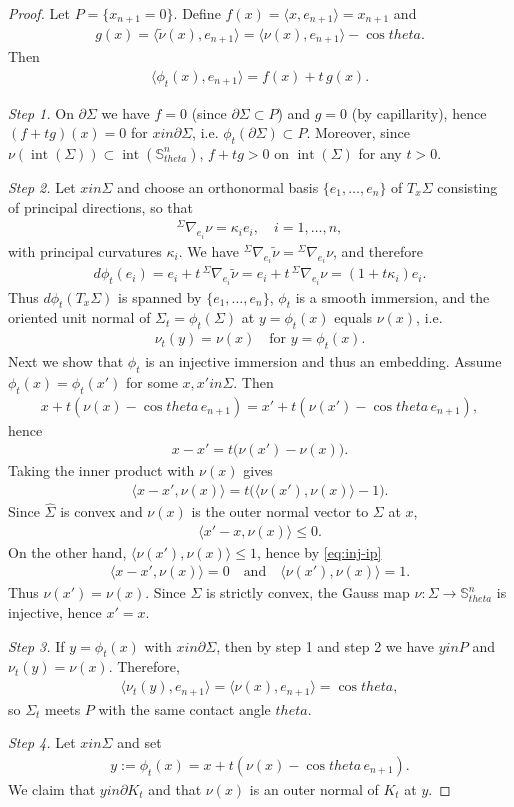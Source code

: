 \documentclass[10pt,a4paper]{amsart}
\newcommand{\Si}{\Sigma}
\newcommand{\bbS}{\mathbb{S}}
\newcommand{\eq}[1]{\begin{equation}\begin{alignedat}{2}#1\end{alignedat}\end{equation}}
\def\in{in }%
\newcommand{\ip}[2]{\langle #1,#2 \rangle}
\newcommand{\op}[1]{\operatorname{#1}}
\def\theta{theta}%
\newcommand{\wh}{\widehat}
\begin{document}
\begin{proof}
Let $P=\{x_{n+1}=0\}$. Define $f(x)=\langle x,e_{n+1}\rangle=x_{n+1}$ and
\eq{
  g(x)=\langle \tilde\nu(x),e_{n+1}\rangle
       =\langle \nu(x),e_{n+1}\rangle-\cos\theta.
}
Then
\eq{\label{eq:height-after-shift}
  \langle \phi_t(x),e_{n+1}\rangle = f(x)+t\,g(x).
}   

\emph{Step 1.}
On $\partial\Sigma$ we have $f=0$ (since $\partial\Sigma\subset P$) and $g=0$ (by capillarity),
hence $(f+tg)(x)=0$ for $x\in\partial\Sigma$, i.e. $\phi_t(\partial\Sigma)\subset P$. Moreover, since $\nu(\op{int}(\Si))\subset \op{int}(\bbS^n_{\theta})$, $f+t g>0$ on $\op{int}(\Sigma)$ for any $t>0$. 

\emph{Step 2.}
Let $x\in\Sigma$ and choose an orthonormal basis $\{e_1,\dots,e_n\}$ of $T_x\Sigma$
consisting of principal directions, so that
\eq{
  {}^{\Si}\nabla_{e_i}\nu=\kappa_i e_i,\quad i=1,\dots,n,
}
with principal curvatures $\kappa_i$.
We have ${}^{\Si}\nabla_{e_i}\tilde\nu={}^{\Si}\nabla_{e_i}\nu$, and therefore
\eq{
  d\phi_t(e_i)=e_i+t\,{}^{\Si}\nabla_{e_i}\tilde\nu
  =e_i+t\,{}^{\Si}\nabla_{e_i}\nu
  =(1+t\kappa_i)e_i.
}
Thus $d\phi_t(T_x\Sigma)$ is spanned by $\{e_1,\dots,e_n\}$, $\phi_t$ is a smooth immersion, and the oriented unit normal of $\Sigma_t=\phi_t(\Sigma)$
at $y=\phi_t(x)$ equals $\nu(x)$, i.e.
\eq{
  \nu_t(y)=\nu(x)\quad\text{for }y=\phi_t(x).
}
Next we show that $\phi_t$ is an injective immersion and thus an embedding. Assume $\phi_t(x)=\phi_t(x')$ for some
$x,x'\in\Sigma$. Then
\eq{
  x+t(\nu(x)-\cos\theta\,e_{n+1})=x'+t(\nu(x')-\cos\theta\,e_{n+1}),
}
hence
\eq{\label{eq:inj-start}
  x-x'=t\bigl(\nu(x')-\nu(x)\bigr).
}
Taking the inner product with $\nu(x)$ gives
\eq{\label{eq:inj-ip}
  \ip{x-x'}{\nu(x)}=t\bigl(\ip{\nu(x')}{\nu(x)}-1\bigr).
}
Since $\wh{\Si}$ is convex and $\nu(x)$ is the outer normal vector to $\Si$ at $x$,
\eq{
  \ip{x'-x}{\nu(x)}\le 0.
}
On the other hand, $\ip{\nu(x')}{\nu(x)}\le 1$, hence by \eqref{eq:inj-ip}
\eq{
  \ip{x-x'}{\nu(x)}=0
  \quad\text{and}\quad
  \ip{\nu(x')}{\nu(x)}=1.
}
Thus $\nu(x')=\nu(x)$. Since $\Sigma$ is strictly convex, the Gauss map
$\nu:\Sigma\to\bbS_{\theta}^n$ is injective, hence $x'=x$.

\emph{Step 3.}
If $y=\phi_t(x)$ with $x\in\partial\Sigma$, then by step 1 and step 2 we have $y\in P$ and
$\nu_t(y)=\nu(x)$. Therefore,
\eq{
  \langle \nu_t(y),e_{n+1}\rangle
  = \langle \nu(x),e_{n+1}\rangle
  = \cos\theta,
}
so $\Sigma_t$ meets $P$ with the same contact angle $\theta$.


\emph{Step 4.}
Let $x\in\Sigma$ and set
\eq{
y:=\phi_t(x)=x+t(\nu(x)-\cos\theta\,e_{n+1}).
}
We claim that $y\in\partial K_t$ and that $\nu(x)$ is an outer normal of $K_t$ at $y$.


\end{proof}
\end{document}
